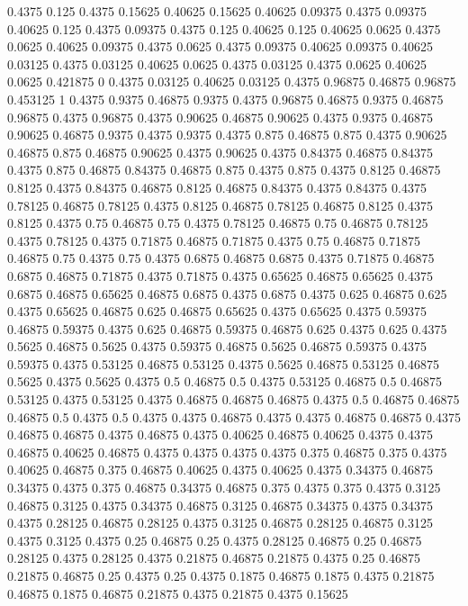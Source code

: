 0.4375 0.125
0.4375 0.15625
0.40625 0.15625
0.40625 0.09375
0.4375 0.09375
0.40625 0.125
0.4375 0.09375
0.4375 0.125
0.40625 0.125
0.40625 0.0625
0.4375 0.0625
0.40625 0.09375
0.4375 0.0625
0.4375 0.09375
0.40625 0.09375
0.40625 0.03125
0.4375 0.03125
0.40625 0.0625
0.4375 0.03125
0.4375 0.0625
0.40625 0.0625
0.421875 0
0.4375 0.03125
0.40625 0.03125
0.4375 0.96875
0.46875 0.96875
0.453125 1
0.4375 0.9375
0.46875 0.9375
0.4375 0.96875
0.46875 0.9375
0.46875 0.96875
0.4375 0.96875
0.4375 0.90625
0.46875 0.90625
0.4375 0.9375
0.46875 0.90625
0.46875 0.9375
0.4375 0.9375
0.4375 0.875
0.46875 0.875
0.4375 0.90625
0.46875 0.875
0.46875 0.90625
0.4375 0.90625
0.4375 0.84375
0.46875 0.84375
0.4375 0.875
0.46875 0.84375
0.46875 0.875
0.4375 0.875
0.4375 0.8125
0.46875 0.8125
0.4375 0.84375
0.46875 0.8125
0.46875 0.84375
0.4375 0.84375
0.4375 0.78125
0.46875 0.78125
0.4375 0.8125
0.46875 0.78125
0.46875 0.8125
0.4375 0.8125
0.4375 0.75
0.46875 0.75
0.4375 0.78125
0.46875 0.75
0.46875 0.78125
0.4375 0.78125
0.4375 0.71875
0.46875 0.71875
0.4375 0.75
0.46875 0.71875
0.46875 0.75
0.4375 0.75
0.4375 0.6875
0.46875 0.6875
0.4375 0.71875
0.46875 0.6875
0.46875 0.71875
0.4375 0.71875
0.4375 0.65625
0.46875 0.65625
0.4375 0.6875
0.46875 0.65625
0.46875 0.6875
0.4375 0.6875
0.4375 0.625
0.46875 0.625
0.4375 0.65625
0.46875 0.625
0.46875 0.65625
0.4375 0.65625
0.4375 0.59375
0.46875 0.59375
0.4375 0.625
0.46875 0.59375
0.46875 0.625
0.4375 0.625
0.4375 0.5625
0.46875 0.5625
0.4375 0.59375
0.46875 0.5625
0.46875 0.59375
0.4375 0.59375
0.4375 0.53125
0.46875 0.53125
0.4375 0.5625
0.46875 0.53125
0.46875 0.5625
0.4375 0.5625
0.4375 0.5
0.46875 0.5
0.4375 0.53125
0.46875 0.5
0.46875 0.53125
0.4375 0.53125
0.4375 0.46875
0.46875 0.46875
0.4375 0.5
0.46875 0.46875
0.46875 0.5
0.4375 0.5
0.4375 0.4375
0.46875 0.4375
0.4375 0.46875
0.46875 0.4375
0.46875 0.46875
0.4375 0.46875
0.4375 0.40625
0.46875 0.40625
0.4375 0.4375
0.46875 0.40625
0.46875 0.4375
0.4375 0.4375
0.4375 0.375
0.46875 0.375
0.4375 0.40625
0.46875 0.375
0.46875 0.40625
0.4375 0.40625
0.4375 0.34375
0.46875 0.34375
0.4375 0.375
0.46875 0.34375
0.46875 0.375
0.4375 0.375
0.4375 0.3125
0.46875 0.3125
0.4375 0.34375
0.46875 0.3125
0.46875 0.34375
0.4375 0.34375
0.4375 0.28125
0.46875 0.28125
0.4375 0.3125
0.46875 0.28125
0.46875 0.3125
0.4375 0.3125
0.4375 0.25
0.46875 0.25
0.4375 0.28125
0.46875 0.25
0.46875 0.28125
0.4375 0.28125
0.4375 0.21875
0.46875 0.21875
0.4375 0.25
0.46875 0.21875
0.46875 0.25
0.4375 0.25
0.4375 0.1875
0.46875 0.1875
0.4375 0.21875
0.46875 0.1875
0.46875 0.21875
0.4375 0.21875
0.4375 0.15625
